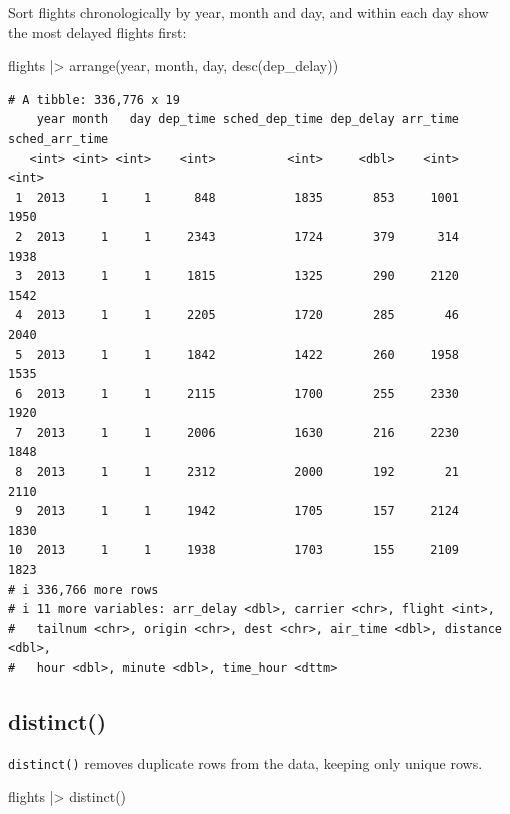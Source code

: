 \documentclass[
  letterpaper,
  DIV=11,
  numbers=noendperiod]{scrreprt}
\newenvironment{Shaded}{\begin{snugshade}}{\end{snugshade}}
\newcommand{\FunctionTok}[1]{\textcolor[rgb]{0.28,0.35,0.67}{#1}}
\newcommand{\NormalTok}[1]{\textcolor[rgb]{0.00,0.23,0.31}{#1}}
\newcommand{\SpecialCharTok}[1]{\textcolor[rgb]{0.37,0.37,0.37}{#1}}
\begin{document}
Sort flights chronologically by year, month and day, and within each day
show the most delayed flights first:

\begin{Shaded}
\begin{Highlighting}[]
\NormalTok{flights }\SpecialCharTok{|\textgreater{}}
  \FunctionTok{arrange}\NormalTok{(year, month, day, }\FunctionTok{desc}\NormalTok{(dep\_delay))}
\end{Highlighting}
\end{Shaded}

\begin{verbatim}
# A tibble: 336,776 x 19
    year month   day dep_time sched_dep_time dep_delay arr_time sched_arr_time
   <int> <int> <int>    <int>          <int>     <dbl>    <int>          <int>
 1  2013     1     1      848           1835       853     1001           1950
 2  2013     1     1     2343           1724       379      314           1938
 3  2013     1     1     1815           1325       290     2120           1542
 4  2013     1     1     2205           1720       285       46           2040
 5  2013     1     1     1842           1422       260     1958           1535
 6  2013     1     1     2115           1700       255     2330           1920
 7  2013     1     1     2006           1630       216     2230           1848
 8  2013     1     1     2312           2000       192       21           2110
 9  2013     1     1     1942           1705       157     2124           1830
10  2013     1     1     1938           1703       155     2109           1823
# i 336,766 more rows
# i 11 more variables: arr_delay <dbl>, carrier <chr>, flight <int>,
#   tailnum <chr>, origin <chr>, dest <chr>, air_time <dbl>, distance <dbl>,
#   hour <dbl>, minute <dbl>, time_hour <dttm>
\end{verbatim}

\subsection{distinct()}\label{distinct}

\texttt{distinct()} removes duplicate rows from the data, keeping only
unique rows.

\begin{Shaded}
\begin{Highlighting}[]
\NormalTok{flights }\SpecialCharTok{|\textgreater{}}
  \FunctionTok{distinct}\NormalTok{()}
\end{Highlighting}
\end{Shaded}
\end{document}

